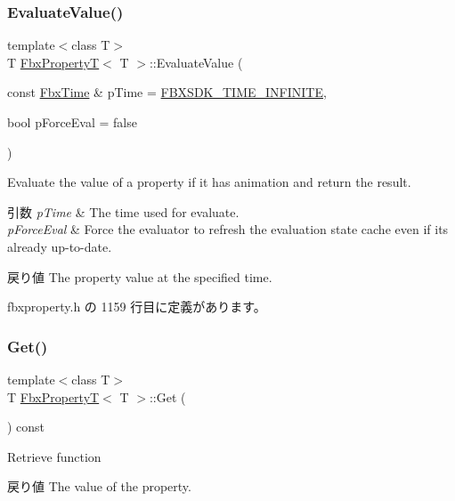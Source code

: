 \subsubsection{\texorpdfstring{Evaluate\+Value()}{EvaluateValue()}}
{\footnotesize\ttfamily template$<$class T$>$ \\
T \hyperlink{class_fbx_property_t}{Fbx\+PropertyT}$<$ T $>$\+::Evaluate\+Value (\begin{DoxyParamCaption}\item[{const \hyperlink{class_fbx_time}{Fbx\+Time} \&}]{p\+Time = {\ttfamily \hyperlink{fbxtime_8h_a1e6db3fe0f84f0b7daa775739f93526f}{F\+B\+X\+S\+D\+K\+\_\+\+T\+I\+M\+E\+\_\+\+I\+N\+F\+I\+N\+I\+TE}},  }\item[{bool}]{p\+Force\+Eval = {\ttfamily false} }\end{DoxyParamCaption})\hspace{0.3cm}{\ttfamily [inline]}}

Evaluate the value of a property if it has animation and return the result. 
\begin{DoxyParams}{引数}
{\em p\+Time} & The time used for evaluate. \\
\hline
{\em p\+Force\+Eval} & Force the evaluator to refresh the evaluation state cache even if its already up-\/to-\/date. \\
\hline
\end{DoxyParams}
\begin{DoxyReturn}{戻り値}
The property value at the specified time. 
\end{DoxyReturn}


 fbxproperty.\+h の 1159 行目に定義があります。

\mbox{\label{class_fbx_property_t_aed683fb109a3a7b1fa4eacd648ae2478}} 
\subsubsection{\texorpdfstring{Get()}{Get()}}
{\footnotesize\ttfamily template$<$class T$>$ \\
T \hyperlink{class_fbx_property_t}{Fbx\+PropertyT}$<$ T $>$\+::Get (\begin{DoxyParamCaption}{ }\end{DoxyParamCaption}) const\hspace{0.3cm}{\ttfamily [inline]}}

Retrieve function \begin{DoxyReturn}{戻り値}
The value of the property. 
\end{DoxyReturn}


